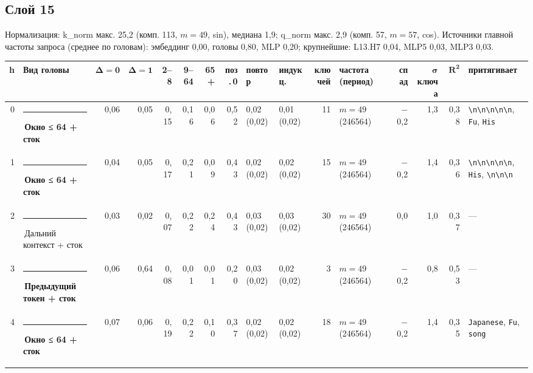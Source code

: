 \documentclass[10pt]{article}
\begin{document}
\noindent\begin{minipage}{\linewidth}
\subsection*{Слой 15}
{\small\color{ink2} Нормализация: k\_norm макс. 25,2 (комп. 113, $m{=}49$, sin), медиана 1,9; q\_norm макс. 2,9 (комп. 57, $m{=}57$, cos). Источники главной частоты запроса (среднее по головам): эмбеддинг 0,00, головы 0,80, MLP 0,20; крупнейшие: L13.H7 0,04, MLP5 0,03, MLP3 0,03.}
\begin{center}{\footnotesize\begin{tabular}{|r|l|r|r|r|r|r|r|l|l|r|l|r|r|r|l|}
\hline
\rowcolor{head}\textbf{h} & \textbf{Вид головы} & $\boldsymbol{\Delta{=}0}$ & $\boldsymbol{\Delta{=}1}$ & \textbf{2–8} & \textbf{9–64} & \textbf{65+} & \textbf{поз.\,0} & \textbf{повтор} & \textbf{индукц.} & \textbf{ключей} & \textbf{частота (период)} & \textbf{спад} & $\boldsymbol{\sigma}$ \textbf{ключа} & $\boldsymbol{R^2}$ & \textbf{притягивает} \\ \hline
0 & \textcolor[HTML]{EDA100}{\rule{0.62em}{0.62em}}\,\textbf{Окно ≤ 64 + сток} & 0,06 & 0,05 & 0,15 & 0,16 & 0,06 & 0,52 & 0,02 (0,02) & 0,01 (0,02) & 11 & $m{=}49$ (246564) & $-$0,2 & 1,3 & 0,38 & \texttt{\textvisiblespace{}\textbackslash{}n\textbackslash{}n\textbackslash{}n\textbackslash{}n\textbackslash{}n}, \texttt{\textvisiblespace{}Fu}, \texttt{\textvisiblespace{}His} \\ \hline
1 & \textcolor[HTML]{EDA100}{\rule{0.62em}{0.62em}}\,\textbf{Окно ≤ 64 + сток} & 0,04 & 0,05 & 0,17 & 0,21 & 0,09 & 0,43 & 0,02 (0,02) & 0,02 (0,02) & 15 & $m{=}49$ (246564) & $-$0,2 & 1,4 & 0,36 & \texttt{\textvisiblespace{}\textbackslash{}n\textbackslash{}n\textbackslash{}n\textbackslash{}n\textbackslash{}n}, \texttt{\textvisiblespace{}His}, \texttt{\textvisiblespace{}\textbackslash{}n\textbackslash{}n\textbackslash{}n} \\ \hline
2 & \textcolor[HTML]{C3C2B7}{\rule{0.62em}{0.62em}}\,Дальний контекст + сток & 0,03 & 0,02 & 0,07 & 0,22 & 0,24 & 0,43 & 0,03 (0,02) & 0,03 (0,02) & 30 & $m{=}49$ (246564) & 0,0 & 1,0 & 0,37 & — \\ \hline
3 & \textcolor[HTML]{2A78D6}{\rule{0.62em}{0.62em}}\,\textbf{Предыдущий токен + сток} & 0,06 & 0,64 & 0,08 & 0,01 & 0,01 & 0,20 & 0,03 (0,02) & 0,02 (0,02) & 3 & $m{=}49$ (246564) & $-$0,2 & 0,8 & 0,53 & — \\ \hline
4 & \textcolor[HTML]{EDA100}{\rule{0.62em}{0.62em}}\,\textbf{Окно ≤ 64 + сток} & 0,07 & 0,06 & 0,19 & 0,22 & 0,10 & 0,37 & 0,02 (0,02) & 0,02 (0,02) & 18 & $m{=}49$ (246564) & $-$0,2 & 1,4 & 0,35 & \texttt{\textvisiblespace{}Japanese}, \texttt{\textvisiblespace{}Fu}, \texttt{\textvisiblespace{}song} \\ \hline

\end{tabular}}
\end{center}
\end{minipage}
\end{document}
